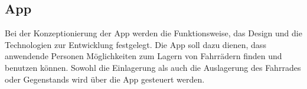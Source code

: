 \subsection{App}
Bei der Konzeptionierung der App werden die Funktionsweise, das Design und die Technologien zur Entwicklung festgelegt.
\noindent Die App soll dazu dienen, dass anwendende Personen Möglichkeiten zum Lagern von Fahrrädern finden und benutzen können. Sowohl die Einlagerung als auch die Auslagerung des Fahrrades oder Gegenstands wird über die App gesteuert werden.


\clearpage

